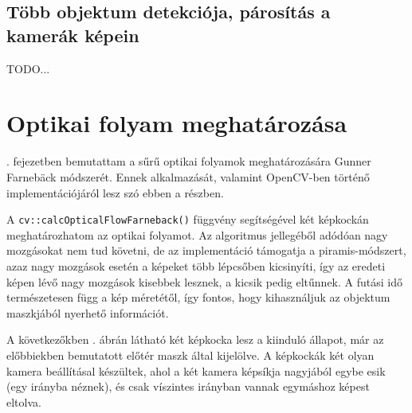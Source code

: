 \subsection{Több objektum detekciója, párosítás a kamerák képein}

{\color{red} TODO...}



\section{Optikai folyam meghatározása}


. fejezetben bemutattam a sűrű optikai folyamok meghatározására Gunner Farnebäck módszerét. Ennek alkalmazását, valamint OpenCV-ben történő implementációjáról lesz szó ebben a részben.

A \texttt{cv::calcOpticalFlowFarneback()} függvény segítségével két képkockán meghatározhatom az optikai folyamot. Az algoritmus jellegéből adódóan nagy mozgásokat nem tud követni, de az implementáció támogatja a piramis-módszert, azaz nagy mozgások esetén a képeket több lépcsőben kicsinyíti, így az eredeti képen lévő nagy mozgások kisebbek lesznek, a kicsik pedig eltűnnek. A futási idő természetesen függ a kép méretétől, így fontos, hogy kihasználjuk az objektum maszkjából nyerhető információt.

A következőkben . ábrán látható két képkocka lesz a kiinduló állapot, már az előbbiekben bemutatott előtér maszk által kijelölve. A képkockák két olyan kamera beállításal készültek, ahol a két kamera képsíkja nagyjából egybe esik (egy irányba néznek), és csak víszintes irányban vannak egymáshoz képest eltolva.

